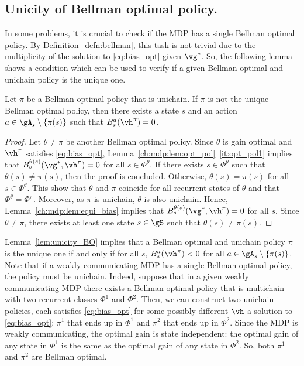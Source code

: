 \subsection{Unicity of Bellman optimal policy.}
\label{ssec:unicity}

In some problems, it is crucial to check if the MDP has a single Bellman optimal policy.
By Definition~\ref{defn:bellman}, this task is not trivial due to the multiplicity of the solution to \eqref{eq:bias_opt} given $\vg^*$.
So, the following lemma shows a condition which can be used to verify if a given Bellman optimal and unichain policy is the unique one.

\begin{lem}
    \label{ch:mdp:lem:unicity_BO}
    Let $\pi$ be a Bellman optimal policy that is unichain. If $\pi$ is not the unique Bellman optimal policy, then there exists a state $s$ and an action $a\in\gA_s\setminus\{\pi(s)\}$ such that $B_s^a(\vh^\pi)=0$.
\end{lem}

\begin{proof}
    Let $\theta\neq\pi$ be another Bellman optimal policy. Since $\theta$ is gain optimal and $\vh^\pi$ satisfies \eqref{eq:bias_opt}, Lemma~\ref{ch:mdp:lem:opt_pol}~\ref{it:opt_pol1} implies that $B_s^{\theta(s)}(\vg^*,\vh^\pi) =0$ for all $s\in\Phi^\theta$. If there exists $s\in\Phi^\theta$ such that $\theta(s)\neq\pi(s)$, then the proof is concluded.  Otherwise, $\theta(s)=\pi(s)$ for all $s\in\Phi^\theta$.
    This show that $\theta$ and $\pi$ coincide for all recurrent states of $\theta$ and that $\Phi^\theta=\Phi^\pi$. Moreover, as $\pi$ is unichain, $\theta$ is also unichain. Hence, Lemma~\ref{ch:mdp:lem:equi_bias} implies that $B_s^{\theta(s)}(\vg^*, \vh^\pi)=0$ for all $s$. Since $\theta\neq\pi$, there exists at least one state $s\in\gS$ such that $\theta(s)\neq\pi(s)$.
\end{proof}
Lemma~\ref{lem:unicity_BO} implies that a Bellman optimal and unichain policy $\pi$ is the unique one if and only if for all $s$, $B_s^a(\vh^\pi)<0$ for all $a\in\gA_s\setminus\{\pi(s)\}$.
Note that if a weakly communicating MDP has a single Bellman optimal policy, the policy must be unichain.
Indeed, suppose that in a given weakly communicating MDP there exists a Bellman optimal policy that is multichain with two recurrent classes $\Phi^1$ and $\Phi^2$.
Then, we can construct two unichain policies, each satisfies \eqref{eq:bias_opt} for some possibly different $\vh$ a solution to \eqref{eq:bias_opt}: $\pi^1$ that ends up in $\Phi^1$ and $\pi^2$ that ends up in $\Phi^2$.
Since the MDP is weakly communicating, the optimal gain is state independent: the optimal gain of any state in $\Phi^1$ is the same as the optimal gain of any state in $\Phi^2$.
So, both $\pi^1$ and $\pi^2$ are Bellman optimal.

